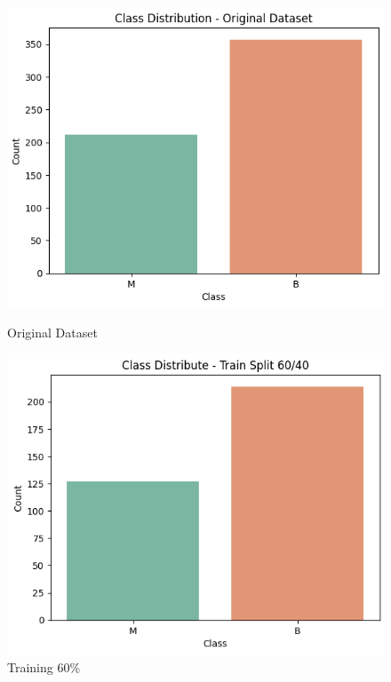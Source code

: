 \begin{figure}[h!]
	\centering
	\begin{minipage}[b]{0.32\linewidth}
		\centering
		\includegraphics[width=\linewidth]{figures/dataset1/2.1.png}
		\caption{Original Dataset}
		\label{fig:original_1}
	\end{minipage}%
	\hfill
	\begin{minipage}[b]{0.32\linewidth}
		\centering
		\includegraphics[width=\linewidth]{figures/dataset1/2.2.png}
		\caption{Training 60\%}
		\label{fig:train60}
	\end{minipage}%
	\hfill
	\begin{minipage}[b]{0.32\linewidth}

\end{minipage}
\end{figure}
